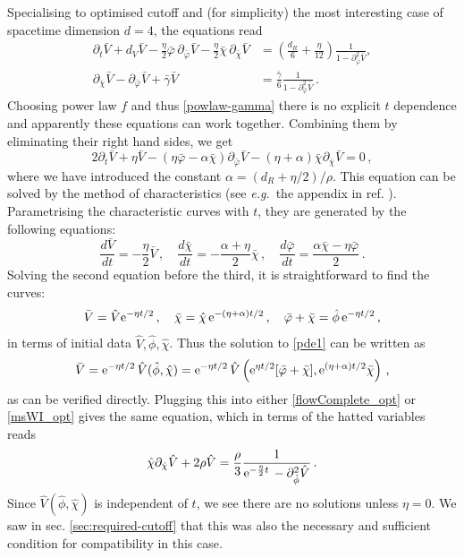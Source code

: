 \documentclass[11pt]{book} %
\newcommand\eg{\textit{e.g.}\ }
\newcommand{\bp}{\bar \varphi}
\newcommand{\bc}{\bar \chi}
\newcommand{\bV}{\bar V}
\newcommand{\hV}{\hat V}
\newcommand{\hp}{\hat \phi}
\newcommand{\hc}{\hat \chi}
\newcommand{\be}{\begin{equation}}
\newcommand{\ee}{\end{equation}}
\begin{document}
Specialising to optimised cutoff and (for simplicity) the most interesting case of spacetime dimension $d=4$,
the equations read
\begin{align}
\label{flowComplete_opt}
\partial_t\bar{V}+
d_V \bar V - \frac{\eta}{2} \bar \varphi \, \partial_{\bar\varphi}\bar V -\frac{\eta}{2} \bar \chi \, \partial_{\bar\chi}\bar V &= \left(  \frac{d_R}{6} + \frac{\eta}{12} \right) \frac{1}{1 -  \partial^2_{\bar\varphi}\bar V},\\
\label{msWI_opt}
\partial_{\bar\chi}\bar V - \partial_{\bar\varphi}\bar V + \bar{\gamma} \bar V &= \frac{\bar{\gamma}}{6} \frac{1}{1 - \partial^2_{\bar\varphi}\bar V}\,.
\end{align}
Choosing power law $f$ and thus \eqref{powlaw-gamma} there is no explicit $t$ dependence and apparently these equations can work together. Combining them by eliminating their right hand sides, we get
\be
\label{pde1}
2\partial_t\bar{V}+\eta\bar{V}-\left(\eta\bar\varphi-\alpha\bc\right)\partial_{\bar{\varphi}}\bar{V}-(\eta+\alpha)\bar\chi\partial_{\bar{\chi}} \bar{V}=0\,,
\ee
where we have introduced the constant $\alpha = (d_R+\eta/2)/\rho$.
This equation can be solved by the method of characteristics (see \eg the appendix in ref. \cite{Dietz:2015owa}). Parametrising the characteristic curves with $t$, they are generated by the following equations:
\be
\frac{d\bV}{dt} = -\frac{\eta}{2}\bV\,,\quad\frac{d\bc}{dt}=-\frac{\alpha+\eta}{2}\bc\,,\quad \frac{d\bp}{dt}=\frac{\alpha\bc-\eta\bp}{2}\,.
\ee
Solving the second equation before the third, it is straightforward to find the curves:
\be
\bV = \hV {\rm e}^{-\eta t/2}\,,\quad \bc = \hc\, {\rm e}^{-(\eta+\alpha)t/2}\,,\quad \bp+\bc = \hp\, {\rm e}^{-\eta t/2}\,,
\ee
in terms of initial data $\hV,\hp,\hc$.
Thus the solution to \eqref{pde1} can be written as
\be
\bV ={\rm e}^{-\eta t/2}\, \hV(\hp,\hc) ={\rm e}^{-\eta t/2} \,\hV\left({\rm e}^{\eta t/2}[\bp+\bc],{\rm e}^{(\eta+\alpha)t/2}\bc\right)\,,
\ee
as can be verified directly. Plugging this into either \eqref{flowComplete_opt} or \eqref{msWI_opt} gives the same equation, which in terms of the hatted variables reads
\be
\hc \partial_{\hc}\hV+2\rho\hV = \frac{\rho}{3}\frac{1}{{\rm e}^{-\frac{\eta}{2} t} \,-\partial^2_{\hp}\hV}\,.
\ee
Since $\hV(\hp,\hc)$ is independent of $t$, we see there are no solutions unless $\eta=0$.
We saw in sec. \ref{sec:required-cutoff} that this was also the necessary and sufficient condition for compatibility in this case.
\end{document}

